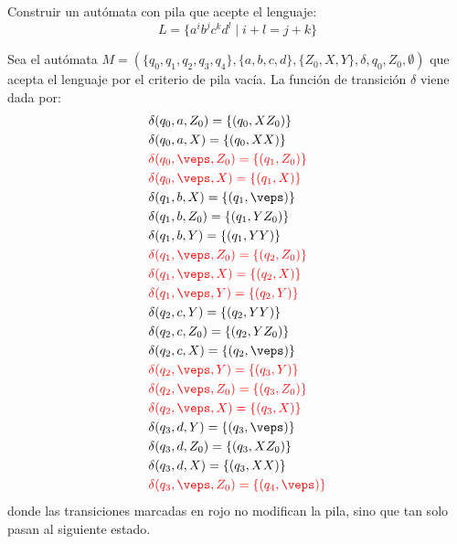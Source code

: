 \begin{ejercicio}\label{ej:1.5.9}
    Construir un autómata con pila que acepte el lenguaje:
    \begin{equation*}
        L = \{a^i b^j c^k d^l \mid i+l = j+k\}
    \end{equation*}

    Sea el autómata $M = (\{q_0, q_1, q_2, q_3, q_4\},\{a,b,c,d\},\{Z_0,X,Y\},\delta,q_0,Z_0,\emptyset)$ que acepta el lenguaje por el criterio de pila vacía.
    La función de transición $\delta$ viene dada por:
    \begin{align*}
        &\delta(q_0,a,Z_0) = \{(q_0,XZ_0)\} \\
        &\delta(q_0,a,X) = \{(q_0,XX)\} \\
        &\red{\delta(q_0,\veps,Z_0) = \{(q_1,Z_0)\} }\\
        &\red{\delta(q_0,\veps,X) = \{(q_1,X)\} }\\
        &\delta(q_1,b,X) = \{(q_1,\veps)\} \\
        &\delta(q_1,b,Z_0) = \{(q_1,YZ_0)\} \\
        &\delta(q_1,b,Y) = \{(q_1,YY)\} \\
        &\red{\delta(q_1,\veps,Z_0) = \{(q_2,Z_0)\}} \\
        &\red{\delta(q_1,\veps,X) = \{(q_2,X)\}} \\
        &\red{\delta(q_1,\veps,Y) = \{(q_2,Y)\} }\\
        &\delta(q_2,c,Y) = \{(q_2,YY)\} \\
        &\delta(q_2,c,Z_0) = \{(q_2,YZ_0)\} \\
        &\delta(q_2,c,X) = \{(q_2,\veps)\} \\
        &\red{\delta(q_2,\veps,Y) = \{(q_3,Y)\} }\\
        &\red{\delta(q_2,\veps,Z_0) = \{(q_3,Z_0)\}} \\
        &\red{\delta(q_2,\veps,X) = \{(q_3,X)\} }\\
        &\delta(q_3,d,Y) = \{(q_3,\veps)\} \\
        &\delta(q_3,d,Z_0) = \{(q_3,XZ_0)\} \\
        &\delta(q_3,d,X) = \{(q_3,XX)\} \\
        &\red{\delta(q_3,\veps,Z_0) = \{(q_4,\veps)\}}
    \end{align*}
    donde las transiciones marcadas en rojo no modifican la pila, sino que tan solo pasan al siguiente estado.
\end{ejercicio}

